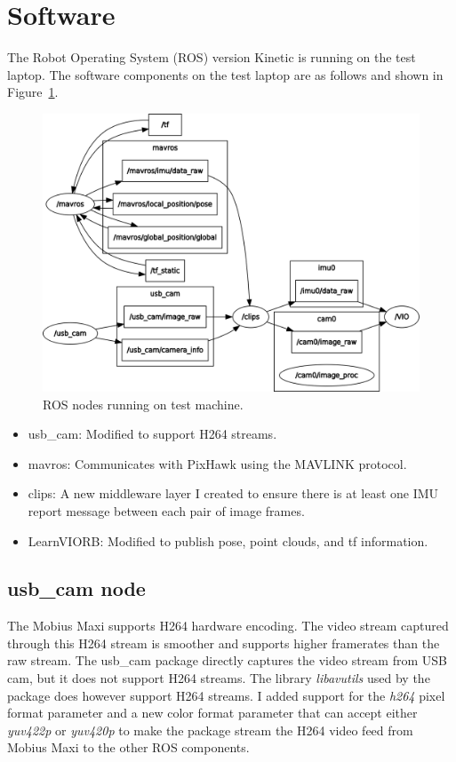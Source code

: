 \section{Software}
The Robot Operating System (ROS) version Kinetic is running on the test laptop. 
The software components on the test laptop are as follows and shown in Figure~\ref{fig:rosgraph}.

\begin{figure} \label{fig:rosgraph}
	\centering
	\includegraphics[width=5in]{figures/rosgraph}
	\caption[ROS node tunning on test machine]{\small 
		ROS nodes running on test machine. }
\end{figure}

\begin{itemize}
	\item usb\_cam: Modified to support H264 streams.
	\item mavros: Communicates with PixHawk using the MAVLINK protocol.
	\item clips: A new middleware layer I created to ensure there is at least one IMU report message between each pair of image frames.
	\item LearnVIORB: Modified to publish pose, point clouds, and tf information.
\end{itemize}

\subsection{usb\_cam node}
The Mobius Maxi supports H264 hardware encoding. The video stream captured through this H264 stream is smoother and supports higher framerates than the raw stream. The usb\_cam package directly captures the video stream from USB cam, but it does not support H264 streams.
The library \textit{libavutils} used by the package does however support H264 streams. I added support for the \textit{h264} pixel format parameter and a new color format parameter that can accept either \textit{yuv422p} or \textit{yuv420p} to make the package stream the H264 video feed from Mobius Maxi to the other ROS components.
 
